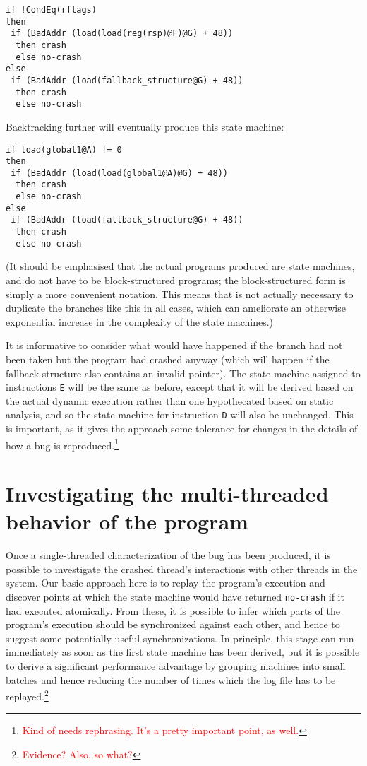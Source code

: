 \documentclass[10pt,twocolumn,preprint,natbib,authoryear]{sigplanconf}
\newcommand{\editorial}[1]{\textcolor{red}{\footnote{\textcolor{red}{#1}}}}
\begin{document}
\begin{verbatim}
if !CondEq(rflags)
then
 if (BadAddr (load(load(reg(rsp)@F)@G) + 48))
  then crash
  else no-crash
else
 if (BadAddr (load(fallback_structure@G) + 48))
  then crash
  else no-crash
\end{verbatim}

Backtracking further will eventually produce this state machine:

\begin{verbatim}
if load(global1@A) != 0
then
 if (BadAddr (load(load(global1@A)@G) + 48))
  then crash
  else no-crash
else
 if (BadAddr (load(fallback_structure@G) + 48))
  then crash
  else no-crash
\end{verbatim}

(It should be emphasised that the actual programs produced are state
machines, and do not have to be block-structured programs; the
block-structured form is simply a more convenient notation.  This
means that is not actually necessary to duplicate the branches like
this in all cases, which can ameliorate an otherwise exponential
increase in the complexity of the state machines.)

It is informative to consider what would have happened if the branch
had not been taken but the program had crashed anyway (which will
happen if the fallback structure also contains an invalid pointer).
The state machine assigned to instructions \verb|E| will be the same
as before, except that it will be derived based on the actual dynamic
execution rather than one hypothecated based on static analysis, and
so the state machine for instruction \verb|D| will also be unchanged.
This is important, as it gives the approach some tolerance for changes
in the details of how a bug is reproduced.\editorial{Kind of needs
  rephrasing.  It's a pretty important point, as well.}

\section{Investigating the multi-threaded behavior of the program}
\label{sect:multi_threading}

Once a single-threaded characterization of the bug has been produced,
it is possible to investigate the crashed thread's interactions with
other threads in the system.  Our basic approach here is to replay the
program's execution and discover points at which the state machine
would have returned \verb|no-crash| if it had executed atomically.
From these, it is possible to infer which parts of the program's
execution should be synchronized against each other, and hence to
suggest some potentially useful synchronizations.  In principle, this
stage can run immediately as soon as the first state machine has been
derived, but it is possible to derive a significant performance
advantage by grouping machines into small batches and hence reducing
the number of times which the log file has to be
replayed.\editorial{Evidence?  Also, so what?}
\end{document}
